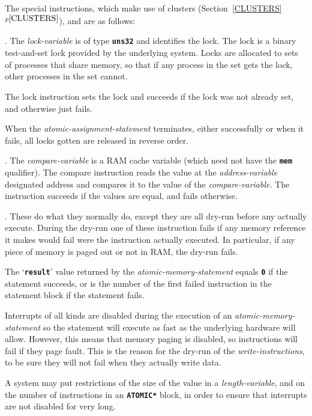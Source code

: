 \documentclass[12pt]{article}
\newcommand{\TT}[1]{{\tt \bfseries #1}}
\newcommand{\itemref}[1]{\ref{#1}$^{p\pageref{#1}}$}
\newenvironment{indpar}[1][0.3in]%
	{\begin{list}{}%
		     {\setlength{\itemsep}{0in}%
		      \setlength{\topsep}{0in}%
		      \setlength{\parsep}{1ex}%
		      \setlength{\labelwidth}{#1}%
		      \setlength{\leftmargin}{#1}%
		      \addtolength{\leftmargin}{\labelsep}}%
	 \item}%
	{\end{list}}
\begin{document}
The special instructions,
which make use of clusters (Section~\itemref{CLUSTERS}),
and are as follows:
\begin{indpar}[0.4in]
\hspace*{-0.2in}{\em \bf Lock-Instruction}.
The {\em lock-variable} is of type \TT{uns32}
and identifies the lock.
The lock is a binary test-and-set lock provided by the
underlying system.  Locks are allocated to sets of processes
that share memory, so that if any process in the set gets
the lock, other processes in the set cannot.

The lock instruction sets the lock and succeeds if the lock
was not already set, and otherwise just fails.

When the {\em atomic-assignment-statement} terminates, either
successfully or when it fails, all locks gotten are released in
reverse order.

\hspace*{-0.2in}{\em \bf Compare-Instruction}.
The {\em compare-variable} is a RAM cache variable (which need
not have the \TT{mem} qualifier).  The compare
instruction reads the value at the {\em address-variable} designated
address and compares
it to the value of the {\em compare-variable}.  The instruction
succeeds if the values are equal, and fails otherwise.


\hspace*{-0.2in}{\em \bf Write-Instructions}.
These do what they normally do, except they are all dry-run 
before any actually execute.  During the dry-run one of these
instruction fails if any memory reference it makes would fail
were the instruction actually executed.  In particular, if any
piece of memory is paged out or not in RAM, the dry-run fails.
\end{indpar}

The `\TT{result}' value returned by the {\em atomic-memory-statement}
equals \TT{0} if the statement succeeds, or is the number of the
first failed instruction in the statement block if the statement
fails.

Interrupts of all kinds are disabled during the execution of an
{\em atomic-memory-statement} so the statement will execute as
fast as the underlying hardware will allow.  However, this means
that memory paging is disabled, so instructions will fail if
they page fault.  This is the reason for the dry-run of the
{\em write-instructions}, to be sure they will not fail
when they actually write data.

A system may put restrictions of the size of the value in
a {\em length-variable}, and on the number of instructions
in an \TT{*ATOMIC*} block, in order to ensure that interrupts
are not disabled for very long.
\end{document}

